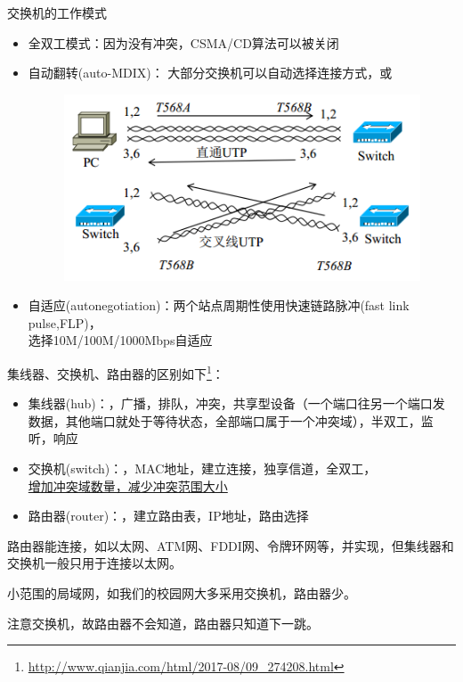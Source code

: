 \myhline
交换机的工作模式
\begin{itemize}
\item 全双工模式：因为没有冲突，CSMA/CD算法可以被关闭
\item 自动翻转(auto-MDIX)：
大部分交换机可以自动选择连接方式，或
\begin{figure}[H]
	\centering
	\includegraphics[width=0.5\linewidth]{fig/auto-MDIX.png}
\end{figure}
\item 自适应(autonegotiation)：两个站点周期性使用快速链路脉冲(fast link pulse,FLP)，\\
选择10M/100M/1000Mbps自适应
\end{itemize}

\myhline
集线器、交换机、路由器的区别如下\footnote{\url{http://www.qianjia.com/html/2017-08/09_274208.html}}：
\begin{itemize}
	\item 集线器(hub)：，广播，排队，冲突，共享型设备（一个端口往另一个端口发数据，其他端口就处于等待状态，全部端口属于一个冲突域），半双工，监听，响应
	\item 交换机(switch)：，MAC地址，建立连接，独享信道，全双工，\\\underline{增加冲突域数量，减少冲突范围大小}
	\item 路由器(router)：，建立路由表，IP地址，路由选择
\end{itemize}

路由器能连接，如以太网、ATM网、FDDI网、令牌环网等，并实现，但集线器和交换机一般只用于连接以太网。

小范围的局域网，如我们的校园网大多采用交换机，路由器少。

注意交换机，故路由器不会知道，路由器只知道下一跳。